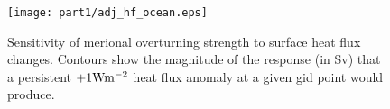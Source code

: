 \begin{figure}
  \begin{center}
   \texttt{[image: part1/adj\_hf\_ocean.eps]}
  \end{center}
\caption{Sensitivity of merional overturning strength to surface heat flux
changes. Contours show the magnitude of the response (in Sv) that a persistent
$+1{\rm W}{\rm m}^{-2}$ heat flux anomaly at a given gid point would
produce.}
\label{fig:hf-sensitivity}
\end{figure}
